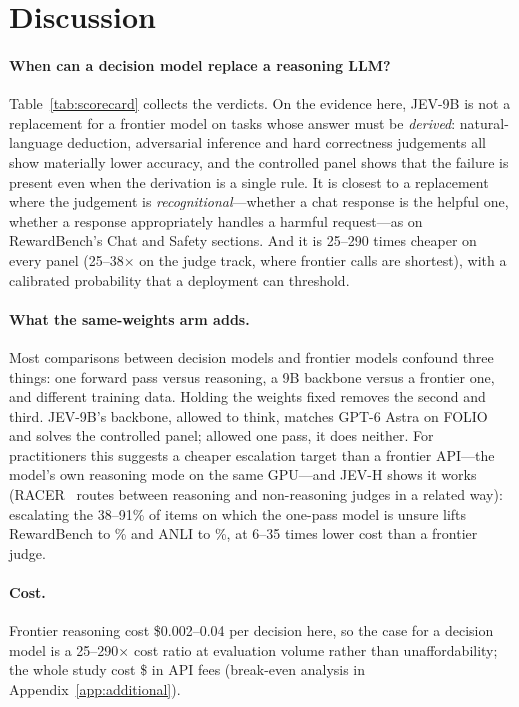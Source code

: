 \section{Discussion}
\label{sec:discussion}

\paragraph{When can a decision model replace a reasoning LLM?}
Table~\ref{tab:scorecard} collects the verdicts.
On the evidence here, JEV-9B is not a replacement for a frontier model on tasks whose answer must be \emph{derived}: natural-language deduction, adversarial inference and hard correctness judgements all show materially lower accuracy, and the controlled panel shows that the failure is present even when the derivation is a single rule.
It is closest to a replacement where the judgement is \emph{recognitional}---whether a chat response is the helpful one, whether a response appropriately handles a harmful request---as on RewardBench's Chat and Safety sections.
And it is 25--290 times cheaper on every panel (25--38$\times$ on the judge track, where frontier calls are shortest), with a calibrated probability that a deployment can threshold.

\paragraph{What the same-weights arm adds.}
Most comparisons between decision models and frontier models confound three things: one forward pass versus reasoning, a 9B backbone versus a frontier one, and different training data.
Holding the weights fixed removes the second and third.
JEV-9B's backbone, allowed to think, matches GPT-6 Astra on FOLIO and solves the controlled panel; allowed one pass, it does neither.
For practitioners this suggests a cheaper escalation target than a frontier API---the model's own reasoning mode on the same GPU---and JEV-H shows it works (RACER~\citep{racer2026} routes between reasoning and non-reasoning judges in a related way): escalating the 38--91\% of items on which the one-pass model is unsure lifts RewardBench to \AccRbHarn\% and ANLI to \AccAnliHarn\%, at 6--35 times lower cost than a frontier judge.



\ifsubmission
\paragraph{Cost.} Frontier reasoning cost \$0.002--0.04 per decision here, so the case for a decision model is a 25--290$\times$ cost ratio at evaluation volume rather than unaffordability; the whole study cost \$\ApiTotal{} in API fees (break-even analysis in Appendix~\ref{app:additional}).
\fi

